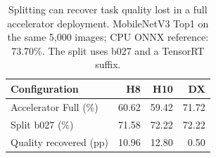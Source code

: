 \begin{table}[t]
\caption{Splitting can recover task quality lost in a full accelerator deployment. MobileNetV3 Top1 on the same 5,000 images; CPU ONNX reference: 73.70\%. The split uses b027 and a TensorRT suffix.}
\label{tab:vendor-quality}
\centering\small
\begin{tabular}{lrrr}
\toprule
Configuration & H8 & H10 & DX\\
\midrule
Accelerator Full (\%) & 60.62 & 59.42 & 71.72\\
Split b027 (\%) & 71.58 & 72.22 & 72.22\\
Quality recovered (pp) & 10.96 & 12.80 & 0.50\\
\bottomrule
\end{tabular}
\end{table}
